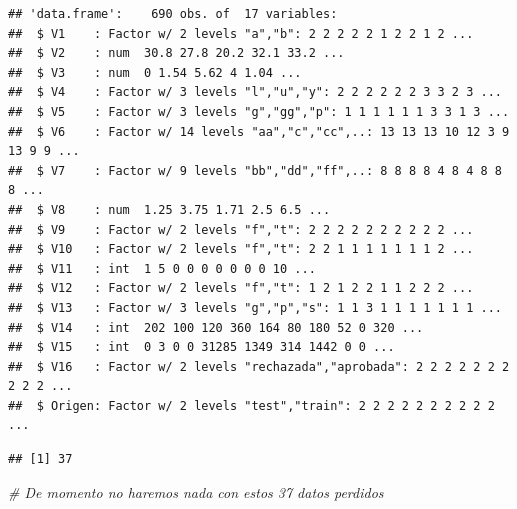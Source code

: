 \documentclass[
]{article}
\newenvironment{Shaded}{\begin{snugshade}}{\end{snugshade}}
\newcommand{\CommentTok}[1]{\textcolor[rgb]{0.56,0.35,0.01}{\textit{#1}}}
\newcommand{\FunctionTok}[1]{\textcolor[rgb]{0.13,0.29,0.53}{\textbf{#1}}}
\newcommand{\NormalTok}[1]{#1}
\newcommand{\OtherTok}[1]{\textcolor[rgb]{0.56,0.35,0.01}{#1}}
\newcommand{\SpecialCharTok}[1]{\textcolor[rgb]{0.81,0.36,0.00}{\textbf{#1}}}
\newcommand{\StringTok}[1]{\textcolor[rgb]{0.31,0.60,0.02}{#1}}
\begin{document}
\begin{verbatim}
## 'data.frame':    690 obs. of  17 variables:
##  $ V1    : Factor w/ 2 levels "a","b": 2 2 2 2 2 1 2 2 1 2 ...
##  $ V2    : num  30.8 27.8 20.2 32.1 33.2 ...
##  $ V3    : num  0 1.54 5.62 4 1.04 ...
##  $ V4    : Factor w/ 3 levels "l","u","y": 2 2 2 2 2 2 3 3 2 3 ...
##  $ V5    : Factor w/ 3 levels "g","gg","p": 1 1 1 1 1 1 3 3 1 3 ...
##  $ V6    : Factor w/ 14 levels "aa","c","cc",..: 13 13 13 10 12 3 9 13 9 9 ...
##  $ V7    : Factor w/ 9 levels "bb","dd","ff",..: 8 8 8 8 4 8 4 8 8 8 ...
##  $ V8    : num  1.25 3.75 1.71 2.5 6.5 ...
##  $ V9    : Factor w/ 2 levels "f","t": 2 2 2 2 2 2 2 2 2 2 ...
##  $ V10   : Factor w/ 2 levels "f","t": 2 2 1 1 1 1 1 1 1 2 ...
##  $ V11   : int  1 5 0 0 0 0 0 0 0 10 ...
##  $ V12   : Factor w/ 2 levels "f","t": 1 2 1 2 2 1 1 2 2 2 ...
##  $ V13   : Factor w/ 3 levels "g","p","s": 1 1 3 1 1 1 1 1 1 1 ...
##  $ V14   : int  202 100 120 360 164 80 180 52 0 320 ...
##  $ V15   : int  0 3 0 0 31285 1349 314 1442 0 0 ...
##  $ V16   : Factor w/ 2 levels "rechazada","aprobada": 2 2 2 2 2 2 2 2 2 2 ...
##  $ Origen: Factor w/ 2 levels "test","train": 2 2 2 2 2 2 2 2 2 2 ...
\end{verbatim}

\hfill\break

\begin{Shaded}
\end{Shaded}

\begin{verbatim}
## [1] 37
\end{verbatim}

\begin{Shaded}
\begin{Highlighting}[]
\CommentTok{\# De momento no haremos nada con estos 37 datos perdidos}
\end{Highlighting}
\end{Shaded}
\end{document}
